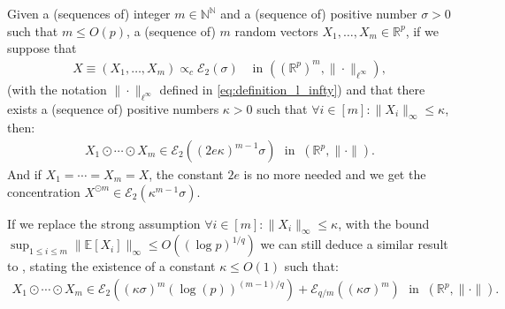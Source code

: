 \documentclass{ws-rmta}
\begin{document}
\begin{theorem}\label{the:concentration_convexe_produit_odot_Rp}
  Given a (sequences of) integer $m \in \mathbb N^{\mathbb N}$ and a (sequence of) positive number $\sigma >0$ such that $m \leq O(p)$, a (sequence of) $m$ random vectors $X_1,\ldots,X_m \in \mathbb R^p$, if we suppose that 
  \begin{align*}
    X \equiv(X_1,\ldots,X_m) \propto_c \mathcal E_2(\sigma)
    &\text{ in } \left((\mathbb R^p)^m, \| \cdot \|_{\ell^\infty}\right),
   \end{align*}
   (with the notation $\|\cdot \|_{\ell^\infty}$ defined in \eqref{eq:definition_l_infty}) %
   and that there exists a (sequence of) positive numbers $\kappa >0$ such that $\forall i\in [m]: \|X_i \|_\infty \leq \kappa$, then:
   \begin{align*}
    X_1\odot \cdots \odot X_m \in \mathcal E_2 \left( (2e\kappa)^{m-1} \sigma\right)  \ \ \ \text{in } \ (\mathbb R^p, \|\cdot\|).
   \end{align*}
   And if $X_1=\cdots=X_m =X$, the constant $2e$ is no more needed and we get the concentration $X^{\odot m} \in \mathcal E_2 \left( \kappa^{m-1} \sigma\right)$.
\end{theorem}
\begin{remark}\label{rem:controle_de_la_queue_de_distribution}
  If we replace the strong assumption $\forall i\in [m]: \|X_i \|_\infty \leq \kappa$, with the bound $\sup_{1\leq i \leq m}\|\mathbb E[X_i] \|_\infty \leq O((\log p)^{1/q})$ we can still deduce a similar result to \cite[Example 4.]{LOU21HV}, stating the existence of a constant $\kappa \leq O(1)$ such that:
   \begin{align*}
    X_1\odot \cdots \odot X_m \in \mathcal E_2 \left( \left(\kappa \sigma\right)^{m} (\log(p))^{(m-1)/q}\right) + \mathcal E_{q/m} \left( \left(\kappa \sigma\right)^{m}\right)  \ \ \ \text{in } \ (\mathbb R^p, \|\cdot\|).
   \end{align*}
\end{remark}
\end{document}
